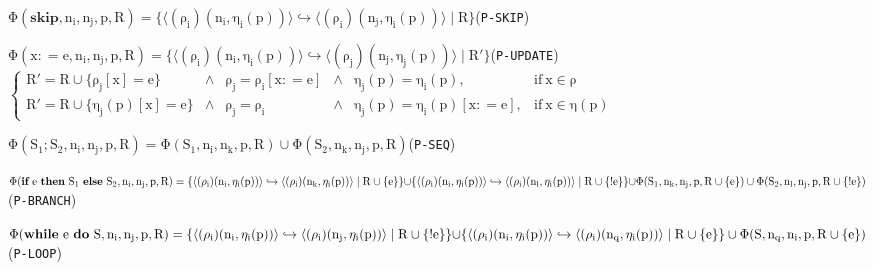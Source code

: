 \documentclass{llncs}
\begin{document}
\begin{figure*}[t]\footnotesize
\begin{minipage}[t]{4.8in}
$\mathrm{\Phi(\textbf{skip},n_i,n_j,p,R)=\{\langle
(\rho_i)(n_i,\eta_i(p))\rangle \hookrightarrow \langle
(\rho_i)(n_j,\eta_i(p))\rangle \mid R\} }$\hfill(\texttt{P-SKIP})

$\mathrm{\Phi(x\mathrel{\mathop:}=
e,n_i,n_j,p,R)=\{\langle(\rho_i)(n_i,\eta_i(p))\rangle
\hookrightarrow \langle(\rho_j)(n_j,\eta_j(p))\rangle \mid
R'\}}$\hspace*{\fill}(\texttt{P-UPDATE})\\
\hspace*{\fill}$\left\{ \begin{array}{llllll}
\mathrm{R'=R\cup\{\rho_j[x]=e\}} &\wedge &
\mathrm{\rho_j=\rho_i[x\mathrel{\mathop:}= e]} &\wedge &
\mathrm{\eta_j(p)=\eta_i(p)}, & \mathrm{if\ x\in \rho}\\
\mathrm{R'=R\cup \{\eta_j(p)[x]=e\}} &\wedge &
\mathrm{\rho_j=\rho_i} &\wedge &
\mathrm{\eta_j(p)=\eta_i(p)[x\mathrel{\mathop:}= e]}, & \mathrm{if\
x\in \eta(p)}\end{array}\right.$\hspace*{\fill}

$\mathrm{\Phi(S_1;S_2,n_i,n_j,p,R)=\Phi(S_1,n_i,n_k,p,R)\cup
\Phi(S_2,n_k,n_j,p,R)}$\hfill(\texttt{P-SEQ})

$\mathrm{\Phi(\textbf{if}\ e\ \textbf{then}\ S_1\ \textbf{else}\
S_2,n_i,n_j,p,R)=\{\langle (\rho_i)(n_i,\eta_i(p))\rangle
\hookrightarrow \langle
(\rho_i)(n_k,\eta_i(p))\rangle \mid R\cup \{e\}\}}\\
\hspace*{\fill}\mathrm{\cup \{\langle (\rho_i)(n_i,\eta_i(p))\rangle \hookrightarrow \langle (\rho_i)(n_l,\eta_i(p))\rangle \mid R\cup \{!e\}\}}\\
\hspace*{\fill}\mathrm{\cup \Phi(S_1,n_k,n_j,p,R\cup \{e\})\cup \Phi(S_2,n_l,n_j,p,R\cup \{!e\})}$\\
\hspace*{\fill}(\texttt{P-BRANCH})

$\mathrm{\Phi(\textbf{while}\ e\ \textbf{do}\
S,n_i,n_j,p,R)=\{\langle (\rho_i)(n_i,\eta_i(p))\rangle
\hookrightarrow \langle (\rho_i)(n_j,\eta_i(p))\rangle \mid R\cup
\{!e\}\}\cup}\\
\hspace*{\fill}\mathrm{\{\langle (\rho_i)(n_i,\eta_i(p))\rangle
\hookrightarrow \langle (\rho_i)(n_q,\eta_i(p))\rangle \mid R\cup
\{e\}\}\cup \Phi(S,n_q,n_i,p,R\cup \{e\})}$\quad (\texttt{P-LOOP})


\end{minipage}
\end{figure*}
\end{document}
